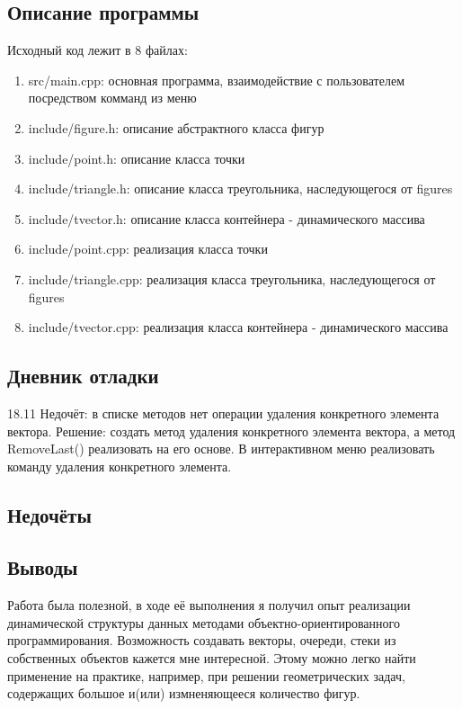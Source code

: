 \documentclass[12pt]{article}
\begin{document}
\subsection*{Описание программы}

Исходный код лежит в 8 файлах:
\begin{enumerate}
\item src/main.cpp: основная программа, взаимодействие с пользователем посредством комманд из меню

\item include/figure.h:    описание абстрактного класса фигур

\item include/point.h:     описание класса точки
\item include/triangle.h:  описание класса треугольника, наследующегося от figures
\item include/tvector.h:     описание класса контейнера - динамического массива

\item include/point.cpp:     реализация класса точки
\item include/triangle.cpp:  реализация класса треугольника, наследующегося от figures
\item include/tvector.cpp: реализация класса контейнера - динамического массива

\end{enumerate}

\subsection*{Дневник отладки}
18.11 Недочёт: в списке методов нет операции удаления конкретного элемента вектора.
\newline Решение: создать метод удаления конкретного элемента вектора, а метод RemoveLast() реализовать на его основе. В интерактивном меню реализовать команду удаления конкретного элемента.

\subsection*{Недочёты}


\subsection*{Выводы}
Работа была полезной, в ходе её выполнения я получил опыт реализации динамической структуры данных методами объектно-ориентированного программирования. Возможность создавать векторы, очереди, стеки из собственных объектов кажется мне интересной. Этому можно легко найти применение на практике, например, при решении геометрических задач, содержащих большое и(или) измненяющееся количество фигур.
\end{document}
